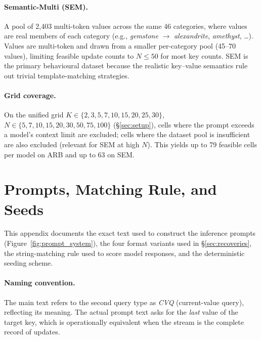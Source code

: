 \documentclass[11pt]{article}
\begin{document}
\paragraph{Semantic-Multi (SEM).}
A pool of 2{,}403 multi-token values across the same 46 categories,
where values are real members of each category (e.g., \textit{gemstone}
$\rightarrow$ \textit{alexandrite}, \textit{amethyst}, \ldots).
Values are multi-token and drawn from a smaller per-category pool
(45--70 values), limiting feasible update counts to $N \leq 50$ for
most key counts.
SEM is the primary behavioural dataset because the realistic
key--value semantics rule out trivial template-matching strategies.

\paragraph{Grid coverage.}
On the unified grid $K \in \{2, 3, 5, 7, 10, 15, 20, 25, 30\}$,
$N \in \{5, 7, 10, 15, 20, 30, 50, 75, 100\}$ (\S\ref{sec:setup}),
cells where the prompt exceeds a model's context limit are excluded;
cells where the dataset pool is insufficient are also excluded
(relevant for SEM at high $N$).
This yields up to 79 feasible cells per model on ARB and up to 63
on SEM.

\section{Prompts, Matching Rule, and Seeds}
\label{app:prompts}

This appendix documents the exact text used to construct the
inference prompts (Figure~\ref{fig:prompt_system}), the four format variants used in
\S\ref{sec:recoveries}, the string-matching rule used to score model
responses, and the deterministic seeding scheme.

\paragraph{Naming convention.}
The main text refers to the second query type as \emph{CVQ}
(current-value query), reflecting its meaning. The actual prompt
text asks for the \emph{last} value of the target key, which is
operationally equivalent when the stream is the complete record of
updates.
\end{document}
